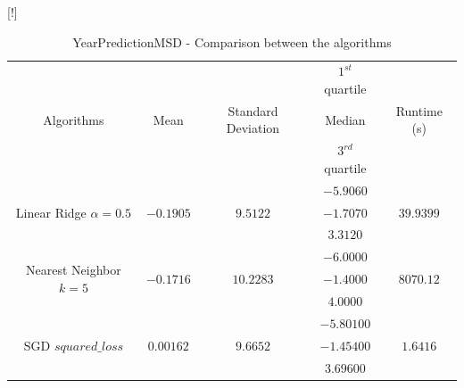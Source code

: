 \begin{table}
	\resizebox{\columnwidth}[!]
	\begin{center}
		\begin{tabular}{|c|c|c|c|c|}
			\hline \multirow{3}{*}{Algorithms} &					&												 & $1^{st}$ quartile & \\
																				 &	Mean 		&		Standard 	Deviation	 & Median						 & Runtime (s)\\
																				 &					&												 & $3^{rd}$ quartile & \\
    	\hline \multirow{3}{*}{Linear Ridge $\alpha=0.5$}&						&						&	$-5.9060$ &\\
																				& $-0.1905$ & $9.5122$  & $-1.7070$ & $39.9399$\\
																										&						&						&	$3.3120$& \\
			\hline \multirow{3}{*}{Nearest Neighbor $k=5$}&						&						&	$-6.0000$ &\\
																				& $-0.1716$ & $10.2283$  & $-1.4000$ & $8070.12$\\
																										&						&						&	$4.0000$& \\
			\hline \multirow{3}{*}{SGD $squared\_loss$}&						&						&	$-5.80100$ &\\
																									& $0.00162$ & $9.6652$  & $-1.45400$ & $1.6416$\\
																										&						&						&	$3.69600$& \\
																										\hline

		\end{tabular}
	\end{center}
	\caption{YearPredictionMSD - Comparison between the algorithms\label{ypmsd:table:conclusion}}
\end{table}

